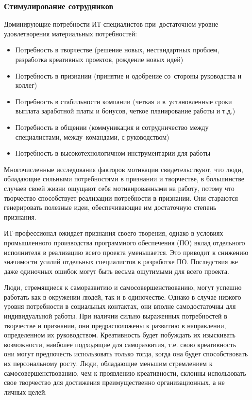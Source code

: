 \documentclass{../industrial-development}
\begin{document}
\begin{frame} \frametitle{Стимулирование сотрудников}
	 Доминирующие потребности ИТ-специалистов при~достаточном уровне удовлетворения материальных потребностей:
	\begin{itemize}				
\item Потребность в творчестве (решение новых, нестандартных проблем, разработка креативных проектов, рождение новых идей)
\item Потребность в признании (принятие и одобрение со~стороны руководства и коллег)
\item Потребность в стабильности компании (четкая и в~установленные сроки выплата заработной платы и бонусов, четкое планирование работы и т.д.)
\item Потребность в общении (коммуникация и
сотрудничество между специалистами, между~командами, с руководством)
\item Потребность в высокотехнологичном инструментарии для работы
\end{itemize}
\end{frame}

\lecturenotes

Многочисленные исследования факторов мотивации свидетельствуют, что люди, обладающие сильными потребностями в признании и творчестве, в большинстве случаев своей жизни ощущают себя мотивированными на работу, потому что творчество способствует реализации потребности в признании. Они стараются генерировать полезные идеи, обеспечивающие им достаточную степень признания.

ИТ-профессионал ожидает признания своего творения, однако в условиях промышленного производства программного обеспечения (ПО) вклад отдельного исполнителя в реализацию всего проекта уменьшается. Это приводит к снижению значимости усилий отдельных специалистов в разработке ПО. Последствия же даже одиночных ошибок могут быть весьма ощутимыми для всего проекта.

Люди, стремящиеся к саморазвитию и самосовершенствованию, могут успешно работать как в окружении людей, так и в одиночестве. Однако в случае низкого уровня потребности в социальных контактах, они вполне самодостаточны для индивидуальной работы. При наличии сильно выраженных потребностей в творчестве и признании, они предрасположены к развитию в направлении, определенном их руководством. Креативность будет побуждать их изыскивать возможности, наиболее подходящие для саморазвития, т.е. свою креативность они могут предпочесть использовать только тогда, когда она будет способствовать их персональному росту. Люди, обладающие меньшим стремлением к самосовершенствованию, чем к проявлению креативности, склонны использовать свое творчество для достижения преимущественно организационных, а не личных целей.
\end{document}
